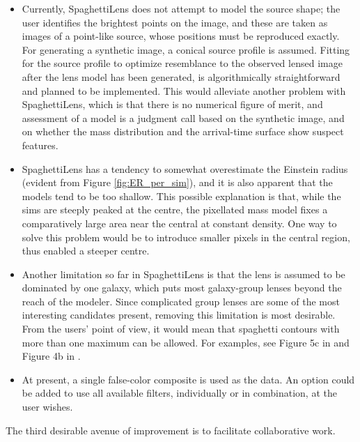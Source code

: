 \documentclass[12pt,preprint]{aastex}
\newcommand{\spl}{SpaghettiLens\xspace}
\begin{document}
\begin{itemize}
\item Currently, \spl does not attempt to model the source shape; the
  user identifies the brightest points on the image, and these are
  taken as images of a point-like source, whose positions must be
  reproduced exactly. For generating a synthetic image, a conical
  source profile is assumed. Fitting for the source profile to
  optimize resemblance to the observed lensed image after the lens
  model has been generated, is algorithmically straightforward and
  planned to be implemented.  This would alleviate another problem
  with \spl, which is that there is no numerical figure of merit, and
  assessment of a model is a judgment call based on the synthetic
  image, and on whether the mass distribution and the arrival-time
  surface show suspect features.
\item \spl has a tendency to somewhat overestimate the Einstein radius
  (evident from Figure \ref{fig:ER_per_sim}), and it is also apparent
  that the models tend to be too shallow.  This possible explanation
  is that, while the sims are steeply peaked at the centre, the
  pixellated mass model fixes a comparatively large area near the
  central at constant density.  One way to solve this problem would be
  to introduce smaller pixels in the central region, thus enabled a
  steeper centre.
\item Another limitation so far in \spl is that the lens is assumed to
  be dominated by one galaxy, which puts most galaxy-group lenses
  beyond the reach of the modeler. Since complicated group lenses are
  some of the most interesting candidates present, removing this
  limitation is most desirable.  From the users' point of view, it
  would mean that spaghetti contours with more than one maximum can be
  allowed.  For examples, see Figure 5c in \citep{2001ApJ...557..594R}
  and Figure 4b in \cite{2003ApJ...590...39K}.
\item At present, a single false-color composite is used as the data.
  An option could be added to use all available filters, individually
  or in combination, at the user wishes.
\end{itemize}

The third desirable avenue of improvement is to facilitate
collaborative work.
\end{document}
